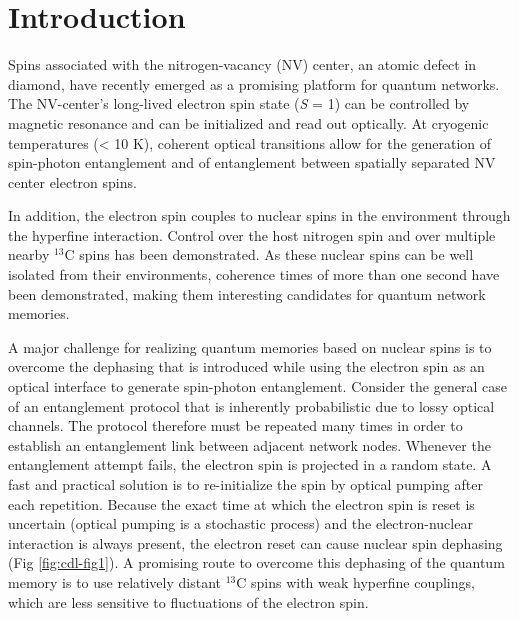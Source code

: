 \section{Introduction}

Spins associated with the nitrogen-vacancy (NV) center, an atomic defect in diamond, have recently emerged as a promising platform for quantum networks\cite{Gao_NatPhoton_2015,Childress__2013}. The NV-center’s long-lived electron spin state (\textit{S} = 1) can be controlled by magnetic resonance and can be initialized and read out optically. At cryogenic temperatures (< 10 K), coherent optical transitions allow for the generation of spin-photon entanglement\cite{Togan_Nature_2010} and of entanglement between spatially separated NV center electron spins\cite{Bernien_Nature_2013,Pfaff_Science_2014}. 

In addition, the electron spin couples to nuclear spins in the environment through the hyperfine interaction. Control over the host nitrogen spin and over multiple nearby $^{13}$C spins has been demonstrated\cite{Jelezko_Phys.Rev.Lett._2004,Dutt_Science_2007,Neumann_Science_2008a,Smeltzer_Phys.Rev.A_2009,Fuchs_NatPhys_2011,vanderSar_Nature_2012,Taminiau_Phys.Rev.Lett._2012}. As these nuclear spins can be well isolated from their environments, coherence times of more than one second have been demonstrated\cite{Maurer_Science_2012}, making them interesting candidates for quantum network memories. 

A major challenge for realizing quantum memories based on nuclear spins is to overcome the dephasing that is introduced while using the electron spin as an optical interface to generate spin-photon entanglement. Consider the general case of an entanglement protocol that is inherently probabilistic due to lossy optical channels. The protocol therefore must be repeated many times in order to establish an entanglement link between adjacent network nodes. Whenever the entanglement attempt fails, the electron spin is projected in a random state. A fast and practical solution is to re-initialize the spin by optical pumping after each repetition. Because the exact time at which the electron spin is reset is uncertain (optical pumping is a stochastic process) and the electron-nuclear interaction is always present, the electron reset can cause nuclear spin dephasing (Fig \ref{fig:cdl-fig1}). A promising route to overcome this dephasing of the quantum memory is to use relatively distant $^{13}$C spins with weak hyperfine couplings, which are less sensitive to fluctuations of the electron spin.  

